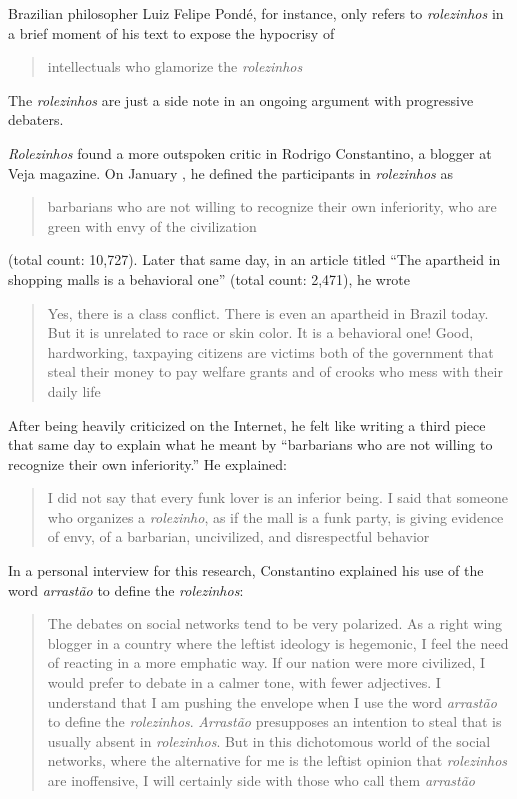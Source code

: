 Brazilian philosopher Luiz Felipe Pondé, for instance, only refers to \emph{rolezinhos} in a brief moment of his text to expose the hypocrisy of \blockcquote{folha_ponde}[.]{intellectuals who glamorize the \emph{rolezinhos}} The \emph{rolezinhos} are just a side note in an ongoing argument with progressive debaters.

\emph{Rolezinhos} found a more outspoken critic in Rodrigo Constantino, a blogger at Veja magazine. On January , he defined the participants in \emph{rolezinhos} as \blockcquote{constantino_barbarie}{barbarians who are not willing to recognize their own inferiority, who are green with envy of the civilization} (total count: 10,727). Later that same day, in an article titled \enquote{The apartheid in shopping malls is a behavioral one} (total count: 2,471), he wrote \blockcquote{constantino_comportamental}[.]{Yes, there is a class conflict. There is even an apartheid in Brazil today. But it is unrelated to race or skin color. It is a behavioral one! Good, hardworking, taxpaying citizens are victims both of the government that steal their money to pay welfare grants and of crooks who mess with their daily life}

After being heavily criticized on the Internet, he felt like writing a third piece that same day to explain what he meant by \enquote{barbarians who are not willing to recognize their own inferiority.} He explained: \blockcquote{constantino_resposta}[.]{I did not say that every funk lover is an inferior being. \textelp{} I said that someone who organizes a \emph{rolezinho}, as if the mall is a funk party, is giving evidence of envy, of a barbarian, uncivilized, and disrespectful behavior}

In a personal interview for this research, Constantino explained his use of the word \emph{arrastão} to define the \emph{rolezinhos}: \blockcquote{interview_constantino}[.]{The debates on social networks tend to be very polarized. As a right wing blogger in a country where the leftist ideology is hegemonic, I feel the need of reacting in a more emphatic way. If our nation were more civilized, I would prefer to debate in a calmer tone, with fewer adjectives. I understand that I am pushing the envelope when I use the word \emph{arrastão} to define the \emph{rolezinhos}. \emph{Arrastão} presupposes an intention to steal that is usually absent in \emph{rolezinhos}. But in this dichotomous world of the social networks, where the alternative for me is the leftist opinion that \emph{rolezinhos} are inoffensive, I will certainly side with those who call them \emph{arrastão}}

